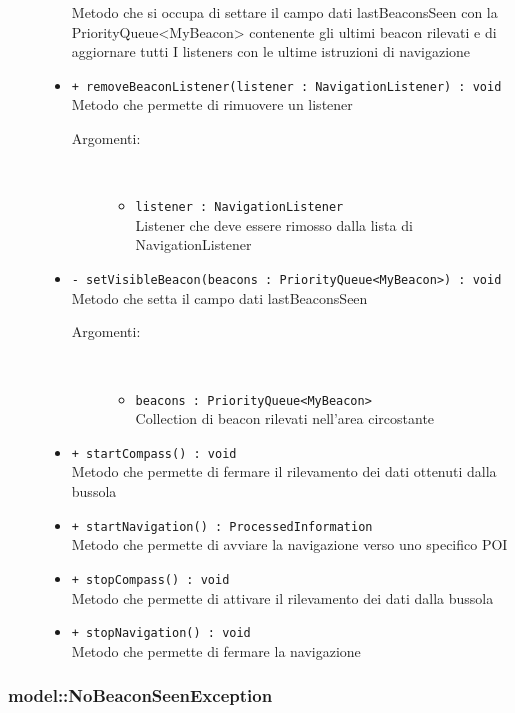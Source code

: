 \documentclass[../DefinizioneDiProdotto.tex]{subfiles}
\begin{document}
\begin{description}
\begin{itemize}
Metodo che si occupa di settare il campo dati lastBeaconsSeen con la PriorityQueue<MyBeacon> contenente gli ultimi beacon rilevati e di aggiornare tutti I listeners con le ultime istruzioni di navigazione
 \item \texttt{+ removeBeaconListener(listener : NavigationListener) : void}\\
Metodo che permette di rimuovere un listener
 \begin{description}
\item[Argomenti:] \
\begin{itemize}
\item \texttt{listener : NavigationListener}\\
Listener che deve essere rimosso dalla lista di NavigationListener\end{itemize}
\end{description}
\item \texttt{- setVisibleBeacon(beacons : PriorityQueue<MyBeacon>) : void}\\
Metodo che setta il campo dati lastBeaconsSeen
 \begin{description}
\item[Argomenti:] \
\begin{itemize}
\item \texttt{beacons : PriorityQueue<MyBeacon>}\\
Collection di beacon rilevati nell'area circostante\end{itemize}
\end{description}
\item \texttt{+ startCompass() : void}\\
Metodo che permette di fermare il rilevamento dei dati ottenuti dalla bussola
 \item \texttt{+ startNavigation() : ProcessedInformation}\\
Metodo che permette di avviare la navigazione verso uno specifico POI
 \item \texttt{+ stopCompass() : void}\\
Metodo che permette di attivare il rilevamento dei dati dalla bussola
 \item \texttt{+ stopNavigation() : void}\\
Metodo che permette di fermare la navigazione
 \end{itemize}
\end{description}

\subsubsection{model::NoBeaconSeenException}
\end{document}
